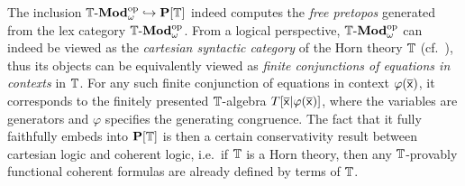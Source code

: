 \begin{remark}\label{rem:freepretopossyntactic}
  The inclusion $\mathbb{T}\text{-}\mathbf{Mod}_\omega^{\mathrm{op}} \hookrightarrow \mathbf{P}[\mathbb{T}]$ indeed computes the \emph{free pretopos} generated from the lex category $\mathbb{T}\text{-}\mathbf{Mod}_\omega^{\mathrm{op}}$. From a logical perspective, $\mathbb{T}\text{-}\mathbf{Mod}_\omega^{\mathrm{op}}$ can indeed be viewed as the \emph{cartesian syntactic category} of the Horn theory $\mathbb{T}$ (cf.~\citet[D3.1]{johnstone2002sketches}), thus its objects can be equivalently viewed as \emph{finite conjunctions of equations in contexts} in $\mathbb{T}$. For any such finite conjunction of equations in context $\varphi(\overline{\mathsf{x}})$, it corresponds to the finitely presented $\mathbb{T}$-algebra $T[\mathsf{\overline{x}}|\varphi(\overline{\mathsf{x}})]$, where the variables are generators and $\varphi$ specifies the generating congruence. The fact that it fully faithfully embeds into $\mathbf{P}[\mathbb{T}]$ is then a certain conservativity result between cartesian logic and coherent logic, i.e.\ if $\mathbb{T}$ is a Horn theory, then any $\mathbb{T}$-provably functional coherent formulas are already defined by terms of $\mathbb{T}$.
\end{remark}

